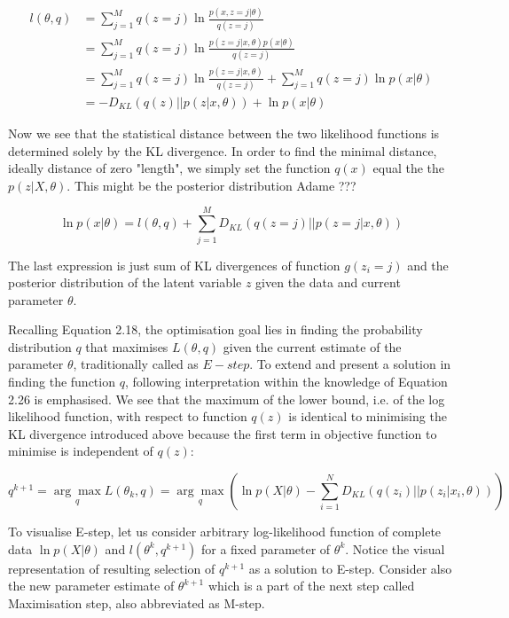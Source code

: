 \begin{align}
l(\theta,q) &= \sum_{j=1}^{M} q(z = j) \ln \frac{p(x, z = j|\theta)}{q(z = j)} \\
& = \sum_{j=1}^{M} q(z = j) \ln \frac{p(z = j|x,\theta) p(x|\theta)}{q(z = j)} \\
& = \sum_{j=1}^{M} q(z = j) \ln \frac{p(z = j|x,\theta)}{q(z = j)} + \sum_{j=1}^{M} q(z = j) \ln p(x|\theta)\\
& = -D_{KL}(q(z)||p(z|x,\theta)) + \ln p(x|\theta)
\end{align}

Now we see that the statistical distance between the two likelihood functions is determined solely by the KL divergence. In order to find the minimal distance, ideally distance of zero "length", we simply set the function $q(x)$ equal the the $p(z|X,\theta)$. This might be the posterior distribution Adame ???

\begin{equation}
\ln p(x|\theta) = l(\theta,q) + \sum_{j=1}^{M} D_{KL}(q(z=j)||p(z=j|x,\theta)) 
\end{equation}
   
The last expression is just sum of KL divergences of function $g(z_i = j)$ and the posterior distribution of the latent variable $z$ given the data and current parameter $\theta$. 

Recalling Equation 2.18, the optimisation goal lies in finding the probability distribution $q$ that maximises $L(\theta, q)$ given the current estimate of the parameter $\theta$, traditionally called as $E-step$. To extend and present a solution in finding the function $q$, following interpretation within the knowledge of Equation 2.26 is emphasised. We see that the maximum of the lower bound, i.e. of the log likelihood function, with respect to function $q(z)$ is identical to minimising the KL divergence introduced above because the first term in objective function to minimise is independent of $q(z)$: 

\begin{equation}
q^{k+1} = \underset{q}{\arg\max} L(\theta_k, q) = \underset{q}{\arg\max} (\ln p(X|\theta)  - \sum_{i=1}^{N} D_{KL} (q(z_i) || p(z_i|x_i,\theta)))
\end{equation}

To visualise E-step, let us consider arbitrary log-likelihood function of complete data $\ln p(X|\theta)$ and $l(\theta^k,q^{k+1})$ for a fixed parameter of $\theta^k$. Notice the visual representation of resulting selection of $q^{k+1}$ as a solution to E-step. Consider also the new parameter estimate of $\theta^{k+1}$ which is a part of the next step called Maximisation step, also abbreviated as M-step.

